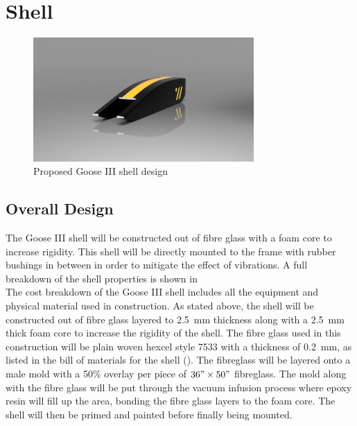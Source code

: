 \documentclass[main.tex]{subfiles}
\begin{document}
\section{Shell}
\begin{figure}[H]
  \centering
  \includegraphics[width=0.75\textwidth]{images/BTTF_Render1.png}
  \caption{Proposed Goose III shell design}
  \label{fig:shell1}
\end{figure}

    \subsection{Overall Design}
    The Goose III shell will be constructed out of fibre glass with a foam core to increase rigidity. This shell will be directly mounted to the frame with rubber bushings in between in order to mitigate the effect of vibrations. A full breakdown of the shell properties is shown in  \\

   	The cost breakdown of the Goose III shell includes all the equipment and physical material used in construction. As stated above, the shell will be constructed out of fibre glass layered to \SI{2.5}{mm} thickness along with a \SI{2.5}{mm} thick foam core to increase the rigidity of the shell. The fibre glass used in this construction will be plain woven hexcel style 7533 with a thickness of \SI{0.2}{mm}, as listed in the bill of materials for the shell (). The fibreglass will be layered onto a male mold with a 50\% overlay per piece of $36"\times 50"$ fibreglass. The mold along with the fibre glass will be put through the vacuum infusion process where epoxy resin will fill up the area, bonding the fibre glass layers to the foam core. The shell will then be primed and painted before finally being mounted.
\end{document}
